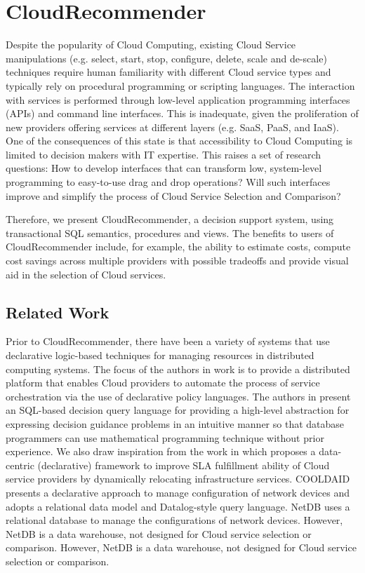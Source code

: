 \section{CloudRecommender}
\label{sec:CloudRecommender}
Despite the popularity of Cloud Computing, existing Cloud Service manipulations (e.g. select, start, stop, configure, delete, scale and de-scale) techniques require human familiarity with different Cloud service types and typically rely on procedural programming or scripting languages. The interaction with services is performed through low-level application programming interfaces (APIs) and command line interfaces. This is inadequate, given the proliferation of new providers offering services at different layers (e.g. SaaS, PaaS, and IaaS). One of the consequences of this state is that accessibility to Cloud Computing is limited to decision makers with IT expertise. This raises a set of research questions: How to develop interfaces that can transform low, system-level programming to easy-to-use drag and drop operations? Will such interfaces improve and simplify the process of Cloud Service Selection and Comparison?

Therefore, we present CloudRecommender, a decision support system, using transactional SQL semantics, procedures and views. The benefits to users of CloudRecommender include, for example, the ability to estimate costs, compute cost savings across multiple providers with possible tradeoffs and provide visual aid in the selection of Cloud services.

\subsection{Related Work}
Prior to CloudRecommender, there have been a variety of systems that use declarative logic-based techniques for managing resources in distributed computing systems. The focus of the authors in work \cite{Liu2011} is to provide a distributed platform that enables Cloud providers to automate the process of service orchestration via the use of declarative policy languages.
The authors in \cite{Brodsky2009} present an SQL-based decision query language for providing a high-level abstraction for expressing decision guidance problems in an intuitive manner so that database programmers can use mathematical programming technique without prior experience.
We also draw inspiration from the work in \cite{DBLPconfCIDRMaoLMF11} which proposes a data-centric (declarative) framework to improve SLA fulfillment ability of Cloud service providers by dynamically relocating infrastructure services.
COOLDAID \cite{Chen2010} presents a declarative approach to manage configuration of network devices and adopts a relational data model and Datalog-style query language.
NetDB \cite{Caldwell2004} uses a relational database to manage the configurations of network devices. However, NetDB is a data warehouse, not designed for Cloud service selection or comparison. However, NetDB is a data warehouse, not designed for Cloud service selection or comparison. 

